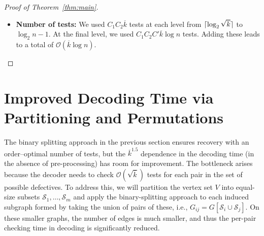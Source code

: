 \documentclass[journal]{IEEEtran}
\theoremstyle{definition}
\theoremstyle{definition}
\newcommand{\Gc}{\mathcal{G}}
\newcommand{\Sc}{\mathcal{S}}
\newcommand{\kb}{\overline{k}}
\DeclarePairedDelimiter\ceil{\lceil}{\rceil}
\newcommand{\bigO}{\mathcal{O}}
\begin{document}
\begin{proof}[Proof of Theorem~\ref{thm:main}]
\begin{itemize}
{}
\item { \textbf{Number of tests: }We used \( C_1 C_2 \kb \) tests at each level from \( \ceil{\log_2 \sqrt{\kb}} \) to \( \log_2 n - 1 \). At the final level, we used \( C_1 C_2 C' \kb \log n \) tests. Adding these leads to a total of  \( \bigO(\kb \log n) \).
	}
     


    
\end{itemize}

\end{proof}

\section{Improved Decoding Time via Partitioning and Permutations}
\label{sec:perm-screening-base}

The binary splitting approach in the previous section ensures recovery with an order–optimal number of tests, but the $\kb^{1.5}$ dependence in the decoding time (in the absence of pre-processing) has room for improvement. The bottleneck arises because the decoder needs to check \(\bigO(\sqrt{\kb})\) tests for each pair in the set of possible defectives. To address this, we will partition the vertex set \(V\) into equal-size subsets \(\Sc_1,\dots,\Sc_m\) and apply the binary-splitting approach to each induced subgraph formed by taking the union of pairs of these, i.e., \(G_{ij}=G[\Sc_i\cup \Sc_j]\). On these smaller graphs, the number of edges is much smaller, and thus the per-pair checking time in decoding is significantly reduced. 
\end{document}
